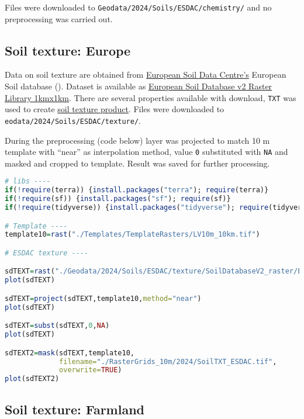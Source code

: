\documentclass[
]{book}
\newcommand{\passthrough}[1]{#1}
\begin{document}
Files were downloaded to \passthrough{\lstinline!Geodata/2024/Soils/ESDAC/chemistry/!} and no preprocessing
was carried out.

\subsection{Soil texture: Europe}\label{Ch04.07.02}

Data on soil texture are obtained from \href{https://esdac.jrc.ec.europa.eu/}{European Soil Data Centre's} European
Soil database (). Dataset is available as \href{https://esdac.jrc.ec.europa.eu/content/european-soil-database-v2-raster-library-1kmx1km}{European Soil Database v2 Raster Library 1kmx1km}. There
are several properties available with download, \passthrough{\lstinline!TXT!} was used to
create \hyperref[Ch05.02]{soil texture product}. Files were downloaded to \passthrough{\lstinline!eodata/2024/Soils/ESDAC/texture/!}.

During the preprocessing (code below) layer was
projected to match 10 m template with ``near'' as interpolation method, value \passthrough{\lstinline!0!}
substituted with \passthrough{\lstinline!NA!} and masked and cropped to template. Result was saved for further
processing.

\begin{lstlisting}[language=R]
# libs ----
if(!require(terra)) {install.packages("terra"); require(terra)}
if(!require(sf)) {install.packages("sf"); require(sf)}
if(!require(tidyverse)) {install.packages("tidyverse"); require(tidyverse)}

# Template ----
template10=rast("./Templates/TemplateRasters/LV10m_10km.tif")

# ESDAC texture ----

sdTEXT=rast("./Geodata/2024/Soils/ESDAC/texture/SoilDatabaseV2_raster/ESDB-Raster-Library-1k-GeoTIFF-20240507/TEXT/TEXT.tif")
plot(sdTEXT)

sdTEXT=project(sdTEXT,template10,method="near")
plot(sdTEXT)

sdTEXT=subst(sdTEXT,0,NA)
plot(sdTEXT)

sdTEXT2=mask(sdTEXT,template10,
             filename="./RasterGrids_10m/2024/SoilTXT_ESDAC.tif",
             overwrite=TRUE)
plot(sdTEXT2)
\end{lstlisting}

\subsection{Soil texture: Farmland}\label{Ch04.07.03}
\end{document}
